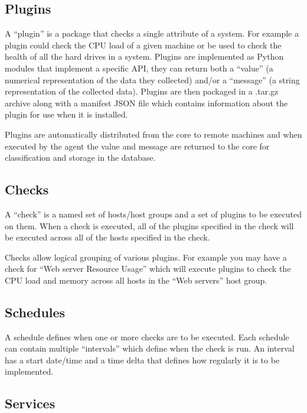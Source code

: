 \documentclass[bsc,logo,twoside,parskip,singlespacing,notimes]{infthesis}
\begin{document}
\subsection{Plugins}

	A ``plugin'' is a package that checks a single attribute of a system.  For
	example a plugin could check the CPU load of a given machine or be used to
	check the health of all the hard drives in a system.  Plugins are implemented
	as Python modules that implement a specific API, they can return both a ``value''
	(a numerical representation of the data they collected) and/or a ``message'' (a
	string representation of the collected data).  Plugins are then packaged in a
	.tar.gz archive along with a manifest JSON file which contains information
	about the plugin for use when it is installed.


	Plugins are automatically distributed from the core to remote machines and when
	executed by the agent the value and message are returned to the core for
	classification and storage in the database.

\subsection{Checks}

	A ``check'' is a named set of hosts/host groups and a set of plugins to be
	executed on them.  When a check is executed, all of the plugins specified in
	the check will be executed across all of the hosts specified in the check.


	Checks allow logical grouping of various plugins.  For example you may have a
	check for ``Web server Resource Usage'' which will execute plugins to check the
	CPU load and memory across all hosts in the ``Web servers'' host group.

\subsection{Schedules}
\label{methodology-schedules}

	A schedule defines when one or more checks are to be executed.  Each schedule
	can contain multiple ``intervals'' which define when the check is run.  An
	interval has a start date/time and a time delta that defines how regularly it
	is to be implemented.

\subsection{Services}
\label{methodology-services}
\end{document}
